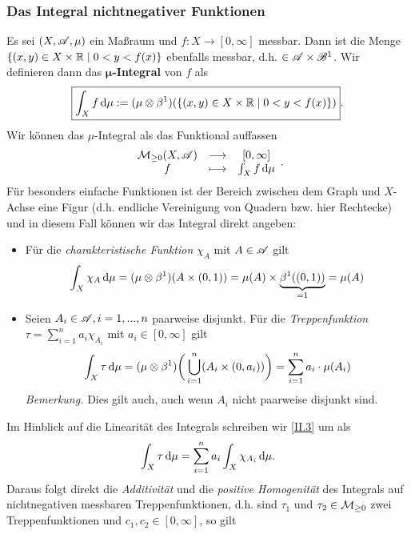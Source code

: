 \subsubsection{Das Integral nichtnegativer Funktionen}
Es sei $(X,\AA,\mu)$ ein Maßraum und $f: X \longrightarrow [0,\infty]$ messbar. Dann ist die Menge $\{(x,y)\in X \times \R \mid 0<y<f(x)\}$ ebenfalls messbar, d.h. $\in \AA \times \BB^1$. Wir definieren dann das \textbf{$\boldsymbol{\mu}$-Integral} von $f$ als 
\begin{equation}
\boxed{\int_X f \D \mu := (\mu \otimes \beta^1) (\{(x,y) \in X \times \R \mid 0<y<f(x)\})}.
\end{equation}
Wir können das $\mu$-Integral als das Funktional auffassen
\begin{equation*}
\begin{array}{ccc}
\MM_{\geq 0}(X,\AA) & \longrightarrow & [0,\infty]\\
f & \longmapsto & \int_X f \D \mu
\end{array}.
\end{equation*}
Für besonders einfache Funktionen ist der Bereich zwischen dem Graph und $X$-Achse eine Figur (d.h. endliche Vereinigung von Quadern bzw. hier Rechtecke) und in diesem Fall können wir das Integral direkt angeben:
\begin{itemize}
\item Für die \emph{charakteristische Funktion} $\chi_A$ mit $A \in \AA$ gilt
\begin{equation} \label{Integral-Char-Fkt}
\int_X \chi_A \D \mu = (\mu \otimes \beta^1) (A \times (0,1)) = \mu (A) \times \underbrace{\beta^1 ((0,1))}_{=1}=\mu(A)
\end{equation}
\item Seien $A_i \in \AA, i=1,...,n$ paarweise disjunkt. Für die \emph{Treppenfunktion} $\tau = \sum\limits_{i=1}^n a_i \chi_{A_i}$ mit $a_i \in [0,\infty]$ gilt
\begin{equation}\label{II.3}
\int_X \tau \D \mu = (\mu \otimes \beta^1) \bigg( \bigcup_{i=1}^n (A_i \times (0,a_i))\bigg)=\sum_{i=1}^n a_i \cdot \mu(A_i)
\end{equation}
\textit{Bemerkung.} Dies gilt auch, auch wenn $A_i$ nicht paarweise disjunkt sind.
\end{itemize}
Im Hinblick auf die Linearität des Integrals schreiben wir \eqref{II.3} um als
$$
\int_X \tau \D \mu = \sum_{i=1}^n a_i \int_X \chi_{A_i} \D \mu.
$$
Daraus folgt direkt die \emph{Additivität} und die \emph{positive Homogenität} des Integrals auf nichtnegativen messbaren Treppenfunktionen, d.h. sind $\tau_1$ und $\tau_2 \in \MM_{\geq 0}$ zwei Treppenfunktionen und $c_1,c_2 \in [0,\infty]$, so gilt
